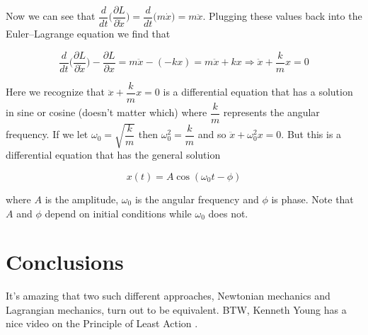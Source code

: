 \documentclass{article}
\theoremstyle{definition}
\begin{document}
\bigskip
\noindent
Now we can see that $\dfrac{d}{dt} \bigg ( \dfrac{\partial
L}{\partial \dot{x}} \bigg )   = \dfrac{d}{dt} \big ( m \dot{x}
\big ) = m \ddot{x}$. Plugging these values back into the
Euler–Lagrange equation we find that 

\bigskip
\begin{equation*}
\dfrac{d}{dt} \bigg ( \dfrac{\partial L}{\partial \dot{x}} \bigg ) - \dfrac{\partial L}{\partial x} = m \ddot{x} - (-kx) = m \ddot{x} + kx \Rightarrow \ddot{x} + \dfrac{k}{m} x = 0
\end{equation*}

\bigskip
{
\noindent
Here we recognize that $\ddot{x} + \dfrac{k}{m} x = 0$ is a
differential equation that has a solution in sine or cosine
(doesn't matter which) where $\dfrac{k}{m}$ represents the
angular frequency. If we let $\omega_0 = \sqrt{\dfrac{k}{m}}$
then $\omega_0^2 = \dfrac{k}{m}$ and so $\ddot{x} + \omega_0^2 x
= 0$. But this is a differential equation that has the general
solution \cite{harmonic_oscillartors} \par} 

 \bigskip
 \begin{equation*}
 x(t) = A \cos (\omega_0 t - \phi)
 \end{equation*}
 
\bigskip
\noindent
where $A$ is the amplitude, $\omega_0$ is the angular frequency
and $\phi$ is phase. Note that $A$ and $\phi$ depend on initial
conditions while  $\omega_0$ does not. 

\bigskip
\section{Conclusions}
It's amazing that two such different approaches, Newtonian
mechanics and Lagrangian mechanics, turn out to be
equivalent. BTW, Kenneth Young has a nice video on the Principle
of Least Action \cite{youtube:kenneth_young_pola}. 
%
%


\end{document}
